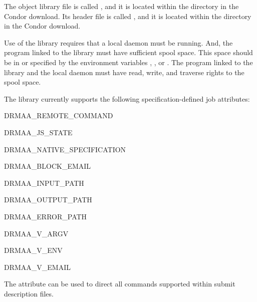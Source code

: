 The object library file is called ,
and it is located within
the  directory in the Condor download.
Its header file  is called , and it is located within
the  directory in the Condor download.

Use of the library requires that a
local  daemon  must be running.
And, the program linked to the library must have
sufficient spool space.
This space should be in 
or specified by the environment variables
, , or .
The program linked to the library and the local  daemon
must have read, write, and traverse rights to the spool space.

The library currently supports the following specification-defined
job attributes:
\begin{description}
\item{DRMAA\_REMOTE\_COMMAND}
\item{DRMAA\_JS\_STATE}
\item{DRMAA\_NATIVE\_SPECIFICATION}
\item{DRMAA\_BLOCK\_EMAIL}
\item{DRMAA\_INPUT\_PATH}
\item{DRMAA\_OUTPUT\_PATH}
\item{DRMAA\_ERROR\_PATH}
\item{DRMAA\_V\_ARGV}
\item{DRMAA\_V\_ENV}
\item{DRMAA\_V\_EMAIL}
\end{description}

The attribute  can be used
to direct all commands supported within
submit description files.

